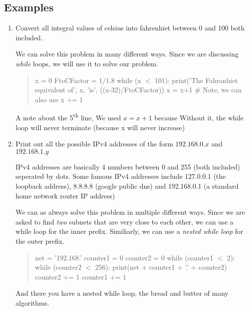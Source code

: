 \subsection{Examples}
\begin{enumerate}
\item Convert all integral values of celsius into fahrenhiet between 0 and 100 both included.


We can solve this problem in many different ways. Since we are discussing \emph{while} loops, we will use it to solve our problem.
\begin{quote}
x = 0 \newline
FtoCFactor = 1/1.8 \newline
while (x $<$ 101):\newline
\tab print('The Fahranhiet equivalent of', x, 'is', ((x-32)/FtoCFactor))\newline
\tab x = x+1 \# Note, we can also use x += 1 \newline
\end{quote}
A note about the 5\textsuperscript{th} line, We used $x = x + 1$ because Without it, the while loop will never terminate (because x will never increase)

\item Print out all the possible IPv4 addresses of the form $192.168.0.x$ and $192.168.1.y$

IPv4 addresses are basically 4 numbers between 0 and 255 (both included) seperated by dots.
Some famous IPv4 addresses include 127.0.0.1 (the loopback address), 8.8.8.8 (google public dns) and 192.168.0.1 (a standard home network router IP address)

We can as always solve this problem in multiple different ways. Since we are asked to find \emph{two} subnets that are very close to each other, we can use a while loop for the inner prefix. Similiarly, we can use a \emph{nested while loop} for the outer prefix.

\begin{quote}
net = '192.168.' \newline
counter1 = 0 \newline
counter2 = 0 \newline
while (counter1 $<$ 2): \newline
\tab while (counter2 $<$ 256): \newline
\tab \tab print(net + counter1 + '.' + counter2) \newline
\tab \tab counter2 += 1 \newline 
\tab counter1 += 1 \newline
\end{quote}
And there you have a nested while loop, the bread and butter of many algorithms.
\end{enumerate}
\newpage
